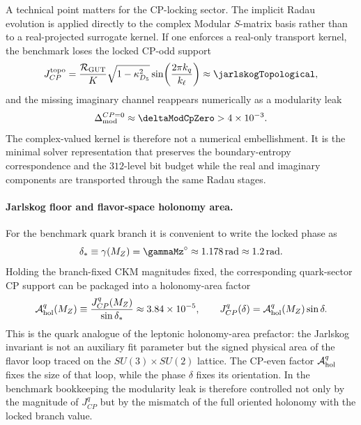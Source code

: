 \documentclass[11pt]{article}
\begin{document}
A technical point matters for the CP-locking sector. The implicit Radau evolution is applied directly to the complex Modular $S$-matrix basis rather than to a real-projected surrogate kernel. If one enforces a real-only transport kernel, the benchmark loses the locked CP-odd support
\begin{equation}
 J_{CP}^{\rm topo}
 =
 \frac{\mathcal R_{\rm GUT}}{K}
 \sqrt{1-\kappa_{D_5}^2}
 \sin\!\left(\frac{2\pi k_q}{k_{\ell}}\right)
 \approx \jarlskogTopological,
\end{equation}
and the missing imaginary channel reappears numerically as a modularity leak
\begin{equation}
 \Delta_{\rm mod}^{CP=0}\approx\deltaModCpZero>4\times10^{-3}.
\end{equation}
The complex-valued kernel is therefore not a numerical embellishment. It is the minimal solver representation that preserves the boundary-entropy correspondence and the $312$-level bit budget while the real and imaginary components are transported through the same Radau stages.

\paragraph{Jarlskog floor and flavor-space holonomy area.}
For the benchmark quark branch it is convenient to write the locked phase as
\begin{equation}
 \delta_{*}
 \equiv
 \gamma(M_Z)
 =
 \gammaMz^{\circ}
 \approx
 1.178\,\mathrm{rad}
 \approx
 1.2\,\mathrm{rad}.
\end{equation}
Holding the branch-fixed CKM magnitudes fixed, the corresponding quark-sector
CP support can be packaged into a holonomy-area factor
\begin{equation}
 \mathcal A_{\rm hol}^{q}(M_Z)
 \equiv
 \frac{J_{CP}^{q}(M_Z)}{\sin\delta_{*}}
 \approx
 3.84\times10^{-5},
 \qquad
 J_{CP}^{q}(\delta)
 =
 \mathcal A_{\rm hol}^{q}(M_Z)\sin\delta.
\end{equation}
This is the quark analogue of the leptonic holonomy-area prefactor: the
Jarlskog invariant is not an auxiliary fit parameter but the signed physical
area of the flavor loop traced on the $SU(3)\times SU(2)$ lattice. The
CP-even factor $\mathcal A_{\rm hol}^{q}$ fixes the size of that loop, while
the phase $\delta$ fixes its orientation. In the benchmark bookkeeping the
modularity leak is therefore controlled not only by the magnitude of
$J_{CP}^{q}$ but by the mismatch of the full oriented holonomy with the locked
branch value.
\end{document}

